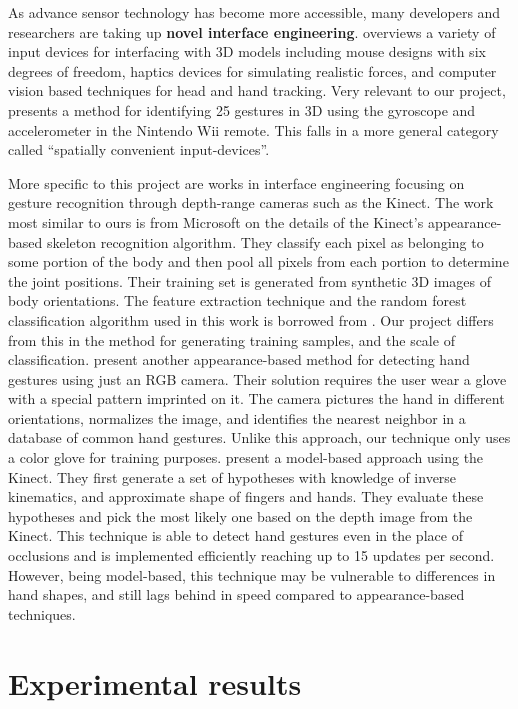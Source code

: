 \documentclass[11pt]{article}
\begin{document}
As advance sensor technology has become more accessible, many developers and researchers are taking up \textbf{novel interface engineering}. \cite{stuerzlinger2010} overviews a variety of input devices for interfacing with 3D models including mouse designs with six degrees of freedom, haptics devices for simulating realistic forces, and computer vision based techniques for head and hand tracking. Very relevant to our project, \cite{hoffman2010} presents a method for identifying 25 gestures in 3D using the gyroscope and accelerometer in the Nintendo Wii remote. This falls in a more general category called ``spatially convenient input-devices''. 

More specific to this project are works in interface engineering focusing on gesture recognition through depth-range cameras such as the Kinect. The work most similar to ours is from Microsoft \cite{shotton2011} on the details of the Kinect's appearance-based skeleton recognition algorithm. They classify each pixel as belonging to some portion of the body and then pool all pixels from each portion to determine the joint positions. Their training set is generated from synthetic 3D images of body orientations. The feature extraction technique and the random forest classification algorithm used in this work is borrowed from \cite{lepetit2005}. Our project differs from this in the method for generating training samples, and the scale of classification. \cite{wang2009} present another appearance-based method for detecting hand gestures using just an RGB camera. Their solution requires the user wear a glove with a special pattern imprinted on it. The camera pictures the hand in different orientations, normalizes the image, and identifies the nearest neighbor in a database of common hand gestures. Unlike this approach, our technique only uses a color glove for training purposes. \cite{oikonomidis2011} present a model-based approach using the Kinect. They first generate a set of hypotheses with knowledge of inverse kinematics, and approximate shape of fingers and hands. They evaluate these hypotheses and pick the most likely one based on the depth image from the Kinect. This technique is able to detect hand gestures even in the place of occlusions and is implemented efficiently reaching up to 15 updates per second. However, being model-based, this technique may be vulnerable to differences in hand shapes, and still lags behind in speed compared to appearance-based techniques. 

\section{Experimental results}
\end{document}

